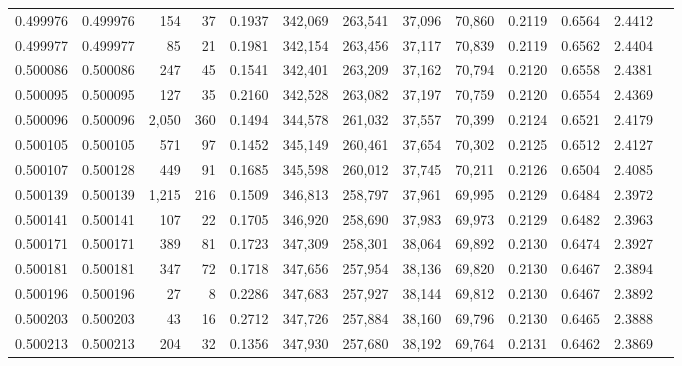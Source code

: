 \begin{tabular}{rrrrrrrrrrrrr}
0.499976 & 0.499976 &   154 &    37 &                                     0.1937 & 342,069 & 263,541 &  37,096 &  70,860 & 0.2119 & 0.6564 & 2.4412 \\
0.499977 & 0.499977 &    85 &    21 &                                     0.1981 & 342,154 & 263,456 &  37,117 &  70,839 & 0.2119 & 0.6562 & 2.4404 \\
0.500086 & 0.500086 &   247 &    45 &                                     0.1541 & 342,401 & 263,209 &  37,162 &  70,794 & 0.2120 & 0.6558 & 2.4381 \\
0.500095 & 0.500095 &   127 &    35 &                                     0.2160 & 342,528 & 263,082 &  37,197 &  70,759 & 0.2120 & 0.6554 & 2.4369 \\
0.500096 & 0.500096 & 2,050 &   360 &                                     0.1494 & 344,578 & 261,032 &  37,557 &  70,399 & 0.2124 & 0.6521 & 2.4179 \\
0.500105 & 0.500105 &   571 &    97 &                                     0.1452 & 345,149 & 260,461 &  37,654 &  70,302 & 0.2125 & 0.6512 & 2.4127 \\
0.500107 & 0.500128 &   449 &    91 &                                     0.1685 & 345,598 & 260,012 &  37,745 &  70,211 & 0.2126 & 0.6504 & 2.4085 \\
0.500139 & 0.500139 & 1,215 &   216 &                                     0.1509 & 346,813 & 258,797 &  37,961 &  69,995 & 0.2129 & 0.6484 & 2.3972 \\
0.500141 & 0.500141 &   107 &    22 &                                     0.1705 & 346,920 & 258,690 &  37,983 &  69,973 & 0.2129 & 0.6482 & 2.3963 \\
0.500171 & 0.500171 &   389 &    81 &                                     0.1723 & 347,309 & 258,301 &  38,064 &  69,892 & 0.2130 & 0.6474 & 2.3927 \\
0.500181 & 0.500181 &   347 &    72 &                                     0.1718 & 347,656 & 257,954 &  38,136 &  69,820 & 0.2130 & 0.6467 & 2.3894 \\
0.500196 & 0.500196 &    27 &     8 &                                     0.2286 & 347,683 & 257,927 &  38,144 &  69,812 & 0.2130 & 0.6467 & 2.3892 \\
0.500203 & 0.500203 &    43 &    16 &                                     0.2712 & 347,726 & 257,884 &  38,160 &  69,796 & 0.2130 & 0.6465 & 2.3888 \\
0.500213 & 0.500213 &   204 &    32 &                                     0.1356 & 347,930 & 257,680 &  38,192 &  69,764 & 0.2131 & 0.6462 & 2.3869 \\

\end{tabular}
